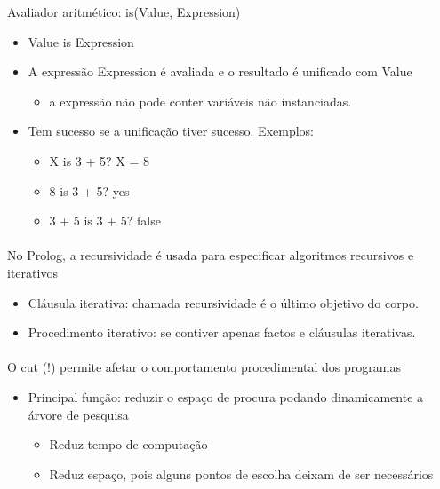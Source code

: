 \documentclass[../resumosPLOG.tex]{subfiles}
\begin{document}
Avaliador aritmético: is(Value, Expression)
\begin{itemize}
    \item Value is Expression
    \item A expressão Expression é avaliada e o resultado é unificado com Value
    \begin{itemize}
        \item a expressão não pode conter variáveis não instanciadas.
    \end{itemize}
    \item Tem sucesso se a unificação tiver sucesso. Exemplos:
    \begin{itemize}
        \item X is 3 + 5? X = 8
        \item 8 is 3 + 5? yes
        \item 3 + 5 is 3 + 5? false
    \end{itemize}
\end{itemize}

\paragraph{}

No Prolog, a recursividade é usada para especificar algoritmos recursivos e iterativos
\begin{itemize}
    \item Cláusula iterativa: chamada recursividade é o último objetivo do corpo.
    \item Procedimento iterativo: se contiver apenas factos e cláusulas iterativas.
\end{itemize}

\paragraph{}

O cut (!) permite afetar o comportamento procedimental dos programas
\begin{itemize}
    \item Principal função: reduzir o espaço de procura podando dinamicamente a árvore de pesquisa
    \begin{itemize}
        \item Reduz tempo de computação
        \item Reduz espaço, pois alguns pontos de escolha deixam de ser necessários
    \end{itemize}
\end{itemize}
\end{document}
